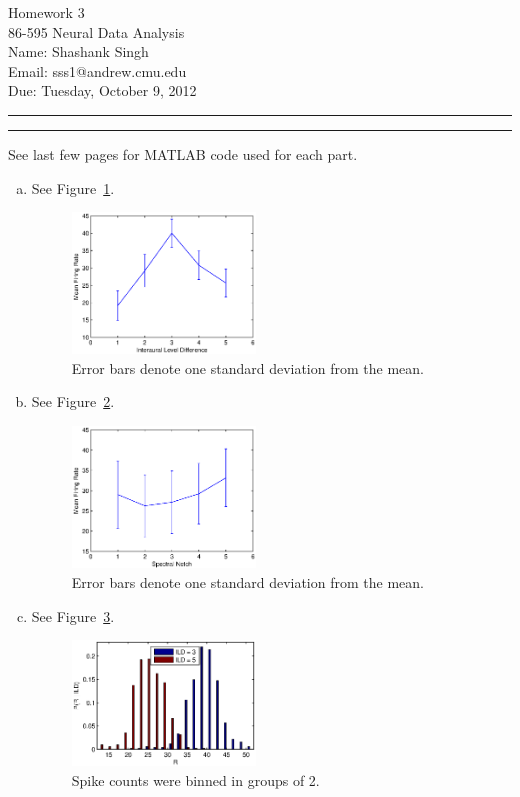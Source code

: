 \documentclass[11pt]{article}
\makeatletter
\newcounter{questionCounter}
\newcounter{partCounter}[questionCounter]
\newenvironment{question}[2][\arabic{questionCounter}]{%
    \setcounter{partCounter}{0}%
    \vspace{.25in} \hrule \vspace{0.5em}%
        \noindent{\bf #2}%
    \vspace{0.8em} \hrule \vspace{.10in}%
    \addtocounter{questionCounter}{1}%
}{}
\newcommand{\myname}{Shashank Singh}
\newcommand{\myandrew}{sss1@andrew.cmu.edu}
\newcommand{\myclass}{86-595 Neural Data Analysis}
\newcommand{\myhwnum}{3}
\newcommand{\duedate}{Tuesday, October 9, 2012}
\makeatother
\begin{document}
\thispagestyle{plain}

{\Large Homework \myhwnum} \\
\myclass \\
Name: \myname \\
Email: \myandrew \\
Due: \duedate \\
\begin{question}{Problem 1}
See last few pages for MATLAB code used for each part.
\begin{enumerate}[a.]
\item
See Figure~\ref{fig:1a}.
\begin{figure}[h]
\begin{center}
\includegraphics[width=0.46\textwidth]{1a}
\end{center}
\caption{Error bars denote one standard deviation from the mean.}
\label{fig:1a}
\end{figure}

\item
See Figure~\ref{fig:1b}.
\begin{figure}[h]
\begin{center}
\includegraphics[width=0.46\textwidth]{1b}
\end{center}
\caption{Error bars denote one standard deviation from the mean.}
\label{fig:1b}
\end{figure}

\item
See Figure~\ref{fig:1c}.
\begin{figure}[h]
\begin{center}
\includegraphics[width=0.46\textwidth]{1c}
\end{center}
\caption{Spike counts were binned in groups of 2.}
\label{fig:1c}
\end{figure}


\end{enumerate}
\end{question}
\end{document}

